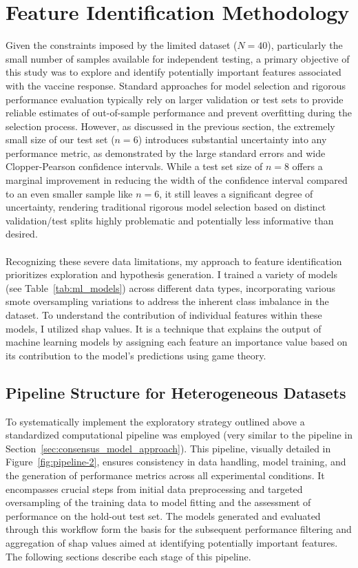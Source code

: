 \documentclass[12pt,a4paper]{report}
\begin{document}
\section{Feature Identification Methodology}
\noindent
Given the constraints imposed by the limited dataset ($N=40$), particularly the small number of samples available for independent testing, a primary objective of this study was to explore and identify potentially important features associated with the vaccine response. Standard approaches for model selection and rigorous performance evaluation typically rely on larger validation or test sets to provide reliable estimates of out-of-sample performance and prevent overfitting during the selection process. However, as discussed in the previous section, the extremely small size of our test set ($n=6$) introduces substantial uncertainty into any performance metric, as demonstrated by the large standard errors and wide Clopper-Pearson confidence intervals. While a test set size of $n=8$ offers a marginal improvement in reducing the width of the confidence interval compared to an even smaller sample like $n=6$, it still leaves a significant degree of uncertainty, rendering traditional rigorous model selection based on distinct validation/test splits highly problematic and potentially less informative than desired.\\
\\
Recognizing these severe data limitations, my approach to feature identification prioritizes exploration and hypothesis generation. I trained a variety of models (see Table~\ref{tab:ml_models}) across different data types, incorporating various \gls{smote} oversampling variations to address the inherent class imbalance in the dataset. To understand the contribution of individual features within these models, I utilized \acrfull{shap} \cite{ApprouchForModelPredictions} values. It is a technique that explains the output of machine learning models by assigning each feature an importance value based on its contribution to the model’s predictions using game theory.

\subsection{Pipeline Structure for Heterogeneous Datasets}
\label{subsec:pipeline_structure_for_Heterogeneous_datasets}
To systematically implement the exploratory strategy outlined above a standardized computational pipeline was employed (very similar to the pipeline in Section~\ref{sec:consensus_model_approach}). This pipeline, visually detailed in Figure~\ref{fig:pipeline-2}, ensures consistency in data handling, model training, and the generation of performance metrics across all experimental conditions. It encompasses crucial steps from initial data preprocessing and targeted oversampling of the training data to model fitting and the assessment of performance on the hold-out test set. The models generated and evaluated through this workflow form the basis for the subsequent performance filtering and aggregation of \gls{shap} values aimed at identifying potentially important features. The following sections describe each stage of this pipeline.
\end{document}
